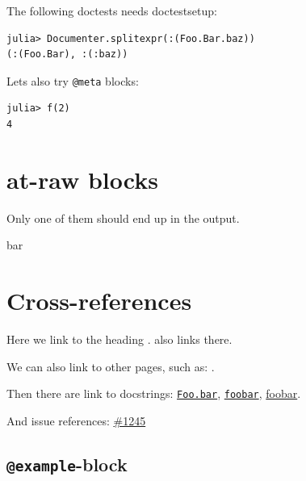 The following doctests needs doctestsetup:




\begin{verbatim}
julia> Documenter.splitexpr(:(Foo.Bar.baz))
(:(Foo.Bar), :(:baz))
\end{verbatim}



Let{\textquotesingle}s also try \texttt{@meta} blocks:






\begin{verbatim}
julia> f(2)
4
\end{verbatim}





\section{at-raw blocks}



\label{15740768154403987329}{}


Only one of them should end up in the output.






bar



\section{Cross-references}



\label{286969376897016401}{}


Here we link to the heading .
 also links there.



We can also link to other pages, such as: .



Then there are link to docstrings: \href{@ref}{\texttt{Foo.bar}}, \href{@ref Foo.bar}{\texttt{foobar}}, \href{@ref Foo.bar}{foobar}.



And issue references: \href{https://example.org/Repository.jl/blob/1245}{\#1245}



\subsection{\texttt{@example}-block}




